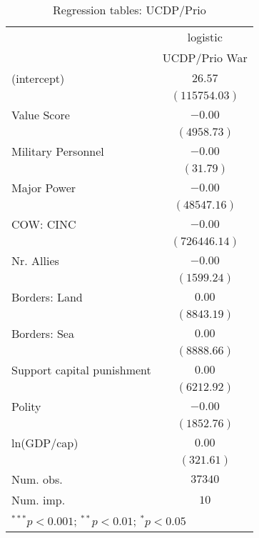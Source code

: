 
\begin{table}
\begin{center}
\begin{tabular}{l c}
\toprule
 & \multicolumn{1}{c}{logistic} \\
\cmidrule(lr){2-2}
 & UCDP/Prio War \\
\midrule
(intercept)                & $26.57$       \\
                           & $(115754.03)$ \\
Value Score                & $-0.00$       \\
                           & $(4958.73)$   \\
Military Personnel         & $-0.00$       \\
                           & $(31.79)$     \\
Major Power                & $-0.00$       \\
                           & $(48547.16)$  \\
COW: CINC                  & $-0.00$       \\
                           & $(726446.14)$ \\
Nr. Allies                 & $-0.00$       \\
                           & $(1599.24)$   \\
Borders: Land              & $0.00$        \\
                           & $(8843.19)$   \\
Borders: Sea               & $0.00$        \\
                           & $(8888.66)$   \\
Support capital punishment & $0.00$        \\
                           & $(6212.92)$   \\
Polity                     & $-0.00$       \\
                           & $(1852.76)$   \\
ln(GDP/cap)                & $0.00$        \\
                           & $(321.61)$    \\
\midrule
Num. obs.                  & $37340$       \\
Num. imp.                  & $10$          \\
\bottomrule
\multicolumn{2}{l}{\scriptsize{$^{***}p<0.001$; $^{**}p<0.01$; $^{*}p<0.05$}}
\end{tabular}
\caption{Regression tables: UCDP/Prio}
\label{UCDPWar}
\end{center}
\end{table}
